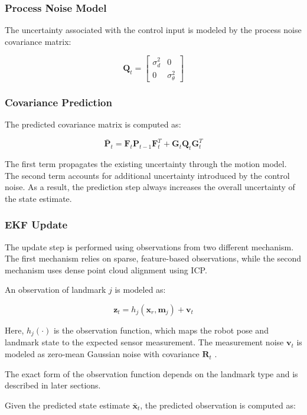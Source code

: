 \documentclass[11pt]{article}
\begin{document}
\subsubsection{Process Noise Model}

The uncertainty associated with the control input
is modeled by the process noise covariance matrix:

\[
\mathbf{Q}_t =
\begin{bmatrix}
	\sigma_d^2  & 0 \\
	0 & \sigma_\theta^2 
\end{bmatrix}
\]

\subsubsection{Covariance Prediction}

The predicted covariance matrix is computed as:

\[
\bar{\mathbf{P}}_t =
\mathbf{F}_t \mathbf{P}_{t-1} \mathbf{F}_t^T
+
\mathbf{G}_t \mathbf{Q}_t \mathbf{G}_t^T
\]

The first term propagates the existing uncertainty through the motion model.
The second term accounts for additional uncertainty introduced by the control noise.
As a result, the prediction step always increases the overall uncertainty of the state estimate.

\subsubsection{EKF Update}
The update step is performed using observations from two different mechanism. The first mechanism relies on sparse, feature-based observations, while the second mechanism uses dense point cloud alignment using ICP.

An observation of landmark $j$ is modeled as:

\[
\mathbf{z}_t = h_j(\mathbf{x}_r, \mathbf{m}_j) + \mathbf{v}_t
\]

Here, $h_j(\cdot)$ is the observation function, which maps the robot pose and landmark state to the expected sensor measurement. The measurement noise $\mathbf{v}_t$ is modeled as zero-mean Gaussian noise with covariance $\mathbf{R}_t$
\cite{thrun2005probabilistic}.

The exact form of the observation function depends on the landmark type and is described in later sections.

Given the predicted state estimate $\bar{\mathbf{x}}_t$, the predicted observation is computed as:
\end{document}
